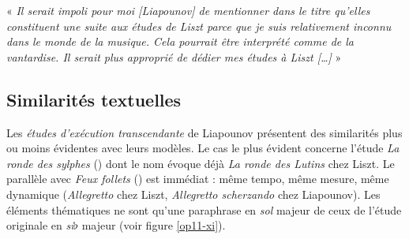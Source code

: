 « \emph{Il serait impoli pour moi [Liapounov] de mentionner dans le titre qu'elles constituent une suite aux études de Liszt parce que je suis relativement inconnu dans le monde de la musique. Cela pourrait être interprété comme de la vantardise. Il serait plus approprié de dédier mes études à Liszt [\dots]} »\\

\subsection{Similarités textuelles}

Les \emph{études d'exécution transcendante} de Liapounov présentent des similarités plus ou moins évidentes avec leurs modèles. Le cas le plus évident concerne l'étude \emph{La ronde des sylphes} () dont le nom évoque déjà \emph{La ronde des Lutins} chez Liszt. Le parallèle avec \emph{Feux follets} () est immédiat : même tempo, même mesure, même dynamique (\emph{Allegretto} chez Liszt, \emph{Allegretto scherzando} chez Liapounov). Les éléments thématiques ne sont qu'une paraphrase en \emph{sol} majeur de ceux de l'étude originale en \emph{si}$\flat$ majeur (voir figure \ref{op11-xi}).

